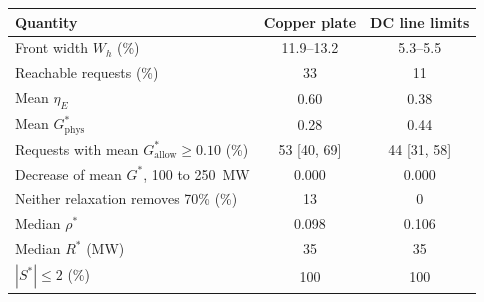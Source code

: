 \begin{tabular}{@{}p{4.6cm}cc@{}}
\toprule
Quantity & Copper plate & DC line limits \\
\midrule
Front width $W_h$ (\%) & 11.9--13.2 & 5.3--5.5 \\
Reachable requests (\%) & 33 & 11 \\
Mean $\eta_E$ & 0.60 & 0.38 \\
Mean $G^{*}_{\mathrm{phys}}$ & 0.28 & 0.44 \\
Requests with mean $G^{*}_{\mathrm{allow}}\ge0.10$ (\%) & 53 [40, 69] & 44 [31, 58] \\
Decrease of mean $G^{*}$, 100 to \SI{250}{MW} & 0.000 & 0.000 \\
Neither relaxation removes 70\% (\%) & 13 & 0 \\
Median $\rho^{*}$ & 0.098 & 0.106 \\
Median $R^{*}$ (MW) & 35 & 35 \\
$|S^{*}|\le2$ (\%) & 100 & 100 \\
\bottomrule
\end{tabular}
